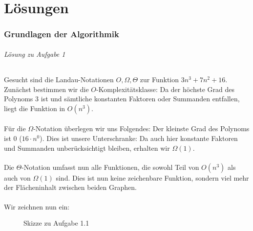 \documentclass[11pt,a4paper]{scrartcl}
\begin{document}
\part{Lösungen}
\section{Grundlagen der Algorithmik}
\paragraph{Lösung zu Aufgabe 1} \label{a1:lsg}Gesucht sind die Landau-Notationen $O, \Omega, \Theta$ zur Funktion $3n^3 + 7n^2 + 16$. Zunächst bestimmen wir die $O$-Komplexitätsklasse: Da der höchste Grad des Polynoms $3$ ist und sämtliche konstanten Faktoren oder Summanden entfallen, liegt die Funktion in $O(n^3)$. \\\\Für die $\Omega$-Notation überlegen wir uns Folgendes: Der kleinste Grad des Polynoms ist $0$ ($16 \cdot n^0$). Dies ist unsere Unterschranke: Da auch hier konstante Faktoren und Summanden unberücksichtigt bleiben, erhalten wir $\Omega(1)$. \\\\Die $\Theta$-Notation umfasst nun alle Funktionen, die sowohl Teil von $O(n^3)$ als auch von $\Omega(1)$ sind. Dies ist nun keine zeichenbare Funktion, sondern viel mehr der Flächeninhalt zwischen beiden Graphen. \\\\Wir zeichnen nun ein:
\begin{figure}[h]
\centering
{}
\caption{Skizze zu Aufgabe 1.1}
\end{figure}
\end{document}
